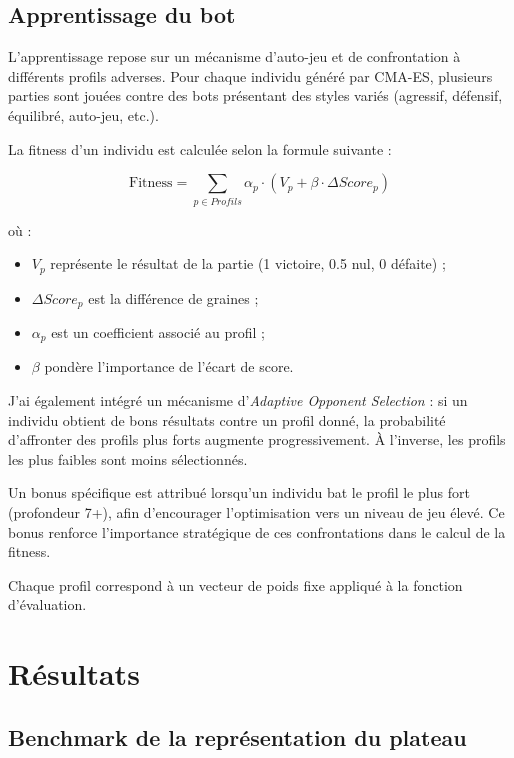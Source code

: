\documentclass[11pt,a4paper]{article}
\begin{document}
\subsection{Apprentissage du bot}

L'apprentissage repose sur un mécanisme d'auto-jeu et de confrontation à différents profils adverses. Pour chaque individu
généré par CMA-ES, plusieurs parties sont jouées contre des bots présentant des styles variés (agressif, défensif, équilibré, auto-jeu,
etc.).

La fitness d'un individu est calculée selon la formule suivante :

\[
\text{Fitness} = \sum_{p \in Profils} \alpha_p \cdot 
\left( V_p + \beta \cdot \Delta Score_p \right)
\]

où :

\begin{itemize}
  \item $V_p$ représente le résultat de la partie (1 victoire, 0.5 nul, 0 défaite) ;
  \item $\Delta Score_p$ est la différence de graines ;
  \item $\alpha_p$ est un coefficient associé au profil ;
  \item $\beta$ pondère l'importance de l'écart de score.
\end{itemize}

J'ai également intégré un mécanisme d’\textit{Adaptive Opponent Selection} : si un individu obtient de bons résultats contre
un profil donné, la probabilité d'affronter des profils plus forts augmente progressivement. À l'inverse, les profils les plus
faibles sont moins sélectionnés.

Un bonus spécifique est attribué lorsqu'un individu bat le profil le plus fort (profondeur 7+), afin d'encourager l'optimisation
vers un niveau de jeu élevé. Ce bonus renforce l'importance stratégique de ces confrontations dans le calcul de la fitness.

Chaque profil correspond à un vecteur de poids fixe appliqué à la fonction d'évaluation.


\section{Résultats}

\subsection{Benchmark de la représentation du plateau}
\end{document}
